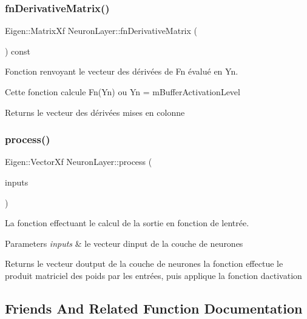 \subsubsection{\texorpdfstring{fn\+Derivative\+Matrix()}{fnDerivativeMatrix()}}
{\footnotesize\ttfamily Eigen\+::\+Matrix\+Xf Neuron\+Layer\+::fn\+Derivative\+Matrix (\begin{DoxyParamCaption}{ }\end{DoxyParamCaption}) const\hspace{0.3cm}{\ttfamily [private]}}



Fonction renvoyant le vecteur des dérivées de Fn évalué en Yn. 

Cette fonction calcule Fn\textquotesingle{}(Yn) ou Yn = m\+Buffer\+Activation\+Level \begin{DoxyReturn}{Returns}
le vecteur des dérivées mises en colonne 
\end{DoxyReturn}
\mbox{\label{classNeuronLayer_aa374ba7d040ae618b5037aa88e5efae7}} 
\subsubsection{\texorpdfstring{process()}{process()}}
{\footnotesize\ttfamily Eigen\+::\+Vector\+Xf Neuron\+Layer\+::process (\begin{DoxyParamCaption}\item[{Eigen\+::\+Vector\+Xf}]{inputs }\end{DoxyParamCaption})}



La fonction effectuant le calcul de la sortie en fonction de l\textquotesingle{}entrée. 


\begin{DoxyParams}{Parameters}
{\em inputs} & le vecteur d\textquotesingle{}input de la couche de neurones \\
\hline
\end{DoxyParams}
\begin{DoxyReturn}{Returns}
le vecteur d\textquotesingle{}output de la couche de neurones la fonction effectue le produit matriciel des poids par les entrées, puis applique la fonction d\textquotesingle{}activation 
\end{DoxyReturn}


\subsection{Friends And Related Function Documentation}
\mbox{\label{classNeuronLayer_adbe40702c22550c0392b3447e5d63c9a}} 
